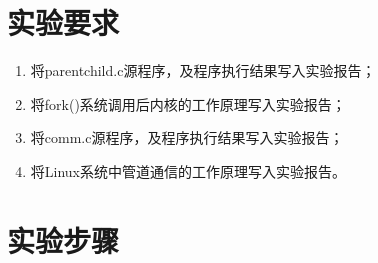 \documentclass[cs4size,a4paper,nofonts]{ctexart}
\begin{document}
\section{实验要求}
\begin{enumerate}
\item 将parentchild.c源程序，及程序执行结果写入实验报告；
\item 将fork()系统调用后内核的工作原理写入实验报告；
\item 将comm.c源程序，及程序执行结果写入实验报告；
\item 将Linux系统中管道通信的工作原理写入实验报告。
\end{enumerate}

\section{实验步骤}
\end{document}
